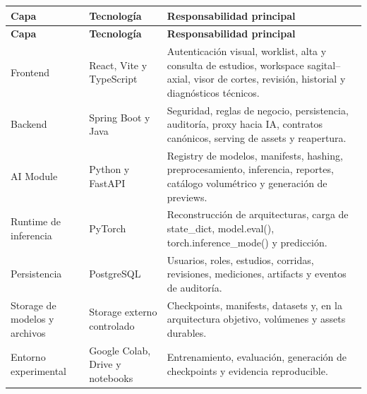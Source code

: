 {\footnotesize
\setlength{\LTleft}{0pt}
\setlength{\LTright}{0pt}
\setlength{\tabcolsep}{2pt}
\renewcommand{\arraystretch}{1.18}
\label{tab:arch-logica-capas}
\begin{longtable}{>{\raggedright\arraybackslash}p{} >{\raggedright\arraybackslash}p{} >{\raggedright\arraybackslash}p{}}
\hline
\textbf{Capa} & \textbf{Tecnología} & \textbf{Responsabilidad principal} \\
\hline
\endfirsthead
\hline
\textbf{Capa} & \textbf{Tecnología} & \textbf{Responsabilidad principal} \\
\hline
\endhead
\hline
\endfoot
Frontend & React, Vite y TypeScript & Autenticación visual, worklist, alta y consulta de estudios, workspace sagital–axial, visor de cortes, revisión, historial y diagnósticos técnicos. \\
Backend & Spring Boot y Java & Seguridad, reglas de negocio, persistencia, auditoría, proxy hacia IA, contratos canónicos, serving de assets y reapertura. \\
AI Module & Python y FastAPI & Registry de modelos, manifests, hashing, preprocesamiento, inferencia, reportes, catálogo volumétrico y generación de previews. \\
Runtime de inferencia & PyTorch & Reconstrucción de arquitecturas, carga de state\_dict, model.eval(), torch.inference\_mode() y predicción. \\
Persistencia & PostgreSQL & Usuarios, roles, estudios, corridas, revisiones, mediciones, artifacts y eventos de auditoría. \\
Storage de modelos y archivos & Storage externo controlado & Checkpoints, manifests, datasets y, en la arquitectura objetivo, volúmenes y assets durables. \\
Entorno experimental & Google Colab, Drive y notebooks & Entrenamiento, evaluación, generación de checkpoints y evidencia reproducible. \\
\hline
\end{longtable}
}

